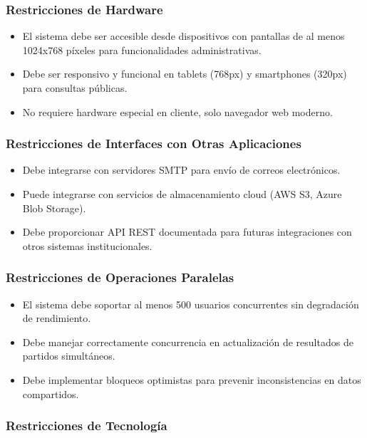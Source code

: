 \documentclass[12pt,a4paper]{article}
\begin{document}
\subsubsection{Restricciones de Hardware}

\begin{itemize}[noitemsep]
    \item El sistema debe ser accesible desde dispositivos con pantallas de al menos 1024x768 píxeles para funcionalidades administrativas.
    \item Debe ser responsivo y funcional en tablets (768px) y smartphones (320px) para consultas públicas.
    \item No requiere hardware especial en cliente, solo navegador web moderno.
\end{itemize}

\subsubsection{Restricciones de Interfaces con Otras Aplicaciones}

\begin{itemize}[noitemsep]
    \item Debe integrarse con servidores SMTP para envío de correos electrónicos.
    \item Puede integrarse con servicios de almacenamiento cloud (AWS S3, Azure Blob Storage).
    \item Debe proporcionar API REST documentada para futuras integraciones con otros sistemas institucionales.
\end{itemize}

\subsubsection{Restricciones de Operaciones Paralelas}

\begin{itemize}[noitemsep]
    \item El sistema debe soportar al menos 500 usuarios concurrentes sin degradación de rendimiento.
    \item Debe manejar correctamente concurrencia en actualización de resultados de partidos simultáneos.
    \item Debe implementar bloqueos optimistas para prevenir inconsistencias en datos compartidos.
\end{itemize}

\subsubsection{Restricciones de Tecnología}
\end{document}
